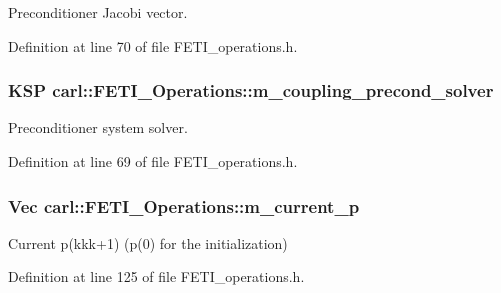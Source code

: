 Preconditioner Jacobi vector. 



Definition at line 70 of file F\+E\+T\+I\+\_\+operations.\+h.

\hypertarget{classcarl_1_1_f_e_t_i___operations_a46747376395ca3167a318a3ce6f6da51}{}
\subsubsection[{m\+\_\+coupling\+\_\+precond\+\_\+solver}]{\setlength{\rightskip}{0pt plus 5cm}K\+S\+P carl\+::\+F\+E\+T\+I\+\_\+\+Operations\+::m\+\_\+coupling\+\_\+precond\+\_\+solver\hspace{0.3cm}{\ttfamily [protected]}}\label{classcarl_1_1_f_e_t_i___operations_a46747376395ca3167a318a3ce6f6da51}


Preconditioner system solver. 



Definition at line 69 of file F\+E\+T\+I\+\_\+operations.\+h.

\hypertarget{classcarl_1_1_f_e_t_i___operations_a9800bde926511daa705bd6bbdd2e2451}{}
\subsubsection[{m\+\_\+current\+\_\+p}]{\setlength{\rightskip}{0pt plus 5cm}Vec carl\+::\+F\+E\+T\+I\+\_\+\+Operations\+::m\+\_\+current\+\_\+p\hspace{0.3cm}{\ttfamily [protected]}}\label{classcarl_1_1_f_e_t_i___operations_a9800bde926511daa705bd6bbdd2e2451}


Current {\ttfamily p(kkk+1)} ({\ttfamily p(0)} for the initialization) 



Definition at line 125 of file F\+E\+T\+I\+\_\+operations.\+h.

\hypertarget{classcarl_1_1_f_e_t_i___operations_ac0f0857e6070cde78612b0ce5e1005e8}{}
